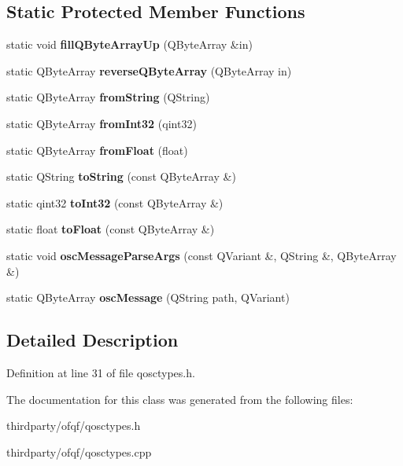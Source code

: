 \subsection*{Static Protected Member Functions}
\begin{DoxyCompactItemize}
\item 
\mbox{\label{class_q_osc_base_a133010348d5588b9ff6cda04c22fcd50}} 
static void {\bfseries fill\+Q\+Byte\+Array\+Up} (Q\+Byte\+Array \&in)
\item 
\mbox{\label{class_q_osc_base_a19ebe9617386c6734766a495d41e31fe}} 
static Q\+Byte\+Array {\bfseries reverse\+Q\+Byte\+Array} (Q\+Byte\+Array in)
\item 
\mbox{\label{class_q_osc_base_a591c83d48b25526d167cb5ad14bf853e}} 
static Q\+Byte\+Array {\bfseries from\+String} (Q\+String)
\item 
\mbox{\label{class_q_osc_base_a3e3297ec7f30d91b6539a6e9271c4620}} 
static Q\+Byte\+Array {\bfseries from\+Int32} (qint32)
\item 
\mbox{\label{class_q_osc_base_aad78407d3c3d07ad6776438e71f1a3f4}} 
static Q\+Byte\+Array {\bfseries from\+Float} (float)
\item 
\mbox{\label{class_q_osc_base_ae183b7ac763261fa08ec245a5794257a}} 
static Q\+String {\bfseries to\+String} (const Q\+Byte\+Array \&)
\item 
\mbox{\label{class_q_osc_base_a67539a0ba8dd153de5ab12b9bbd53b5e}} 
static qint32 {\bfseries to\+Int32} (const Q\+Byte\+Array \&)
\item 
\mbox{\label{class_q_osc_base_a5e424fb8d9fb751325a81d647ca86535}} 
static float {\bfseries to\+Float} (const Q\+Byte\+Array \&)
\item 
\mbox{\label{class_q_osc_base_a8076f615d6b2f37115417b4538aac249}} 
static void {\bfseries osc\+Message\+Parse\+Args} (const Q\+Variant \&, Q\+String \&, Q\+Byte\+Array \&)
\item 
\mbox{\label{class_q_osc_base_ad5b7d6151c09df293bfe272b6772fe30}} 
static Q\+Byte\+Array {\bfseries osc\+Message} (Q\+String path, Q\+Variant)
\end{DoxyCompactItemize}


\subsection{Detailed Description}


Definition at line 31 of file qosctypes.\+h.



The documentation for this class was generated from the following files\+:\begin{DoxyCompactItemize}
\item 
thirdparty/ofqf/qosctypes.\+h\item 
thirdparty/ofqf/qosctypes.\+cpp\end{DoxyCompactItemize}
